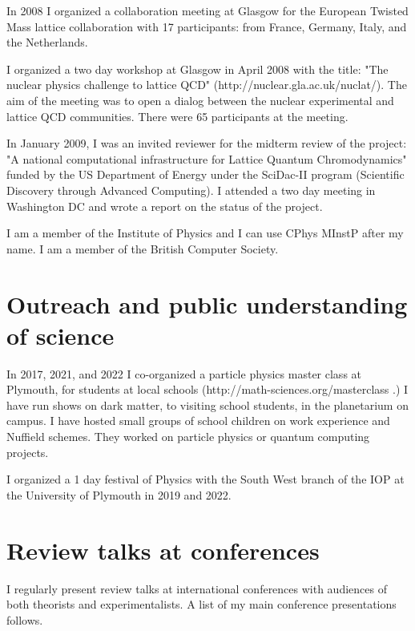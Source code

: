 \documentclass[12pt]{article}
\begin{document}
In 2008 I organized a collaboration meeting at Glasgow for the
European Twisted Mass lattice collaboration with 17 participants: from
France, Germany, Italy, and the Netherlands.

I organized a two day workshop at Glasgow in April 2008 with the
title: "The nuclear physics challenge to lattice QCD"
(http://nuclear.gla.ac.uk/nuclat/). The aim of the meeting was to
open a dialog between the nuclear experimental and lattice
QCD communities. There were 65 participants at the meeting.

In January 2009, I was an invited reviewer for the midterm review of
the project: "A national computational infrastructure for Lattice
Quantum Chromodynamics" funded by the US Department of Energy 
under the SciDac-II program (Scientific Discovery 
through Advanced Computing).
I attended a two day meeting in Washington DC and wrote a report
on the status of the project.

I am a member of the Institute of Physics and I can use
CPhys MInstP after my name. I am a member of the British Computer
Society.

\section{Outreach and public understanding of science}

In 2017, 2021, and 2022 I co-organized a particle physics master 
class at Plymouth, for students at local schools  (http://math-sciences.org/masterclass .)
I have run shows on dark matter, to visiting school students,
in the planetarium on campus. I have hosted small groups
of school children on work experience and Nuffield 
schemes. They worked on particle physics or quantum computing
projects.

I organized a 1 day festival of Physics with the South West branch of
the IOP at the University of Plymouth in 2019 and 2022.



\section{Review talks at conferences}

I regularly present review talks at international
conferences with audiences of both theorists and experimentalists.
A list of my main conference presentations follows.
\end{document}

